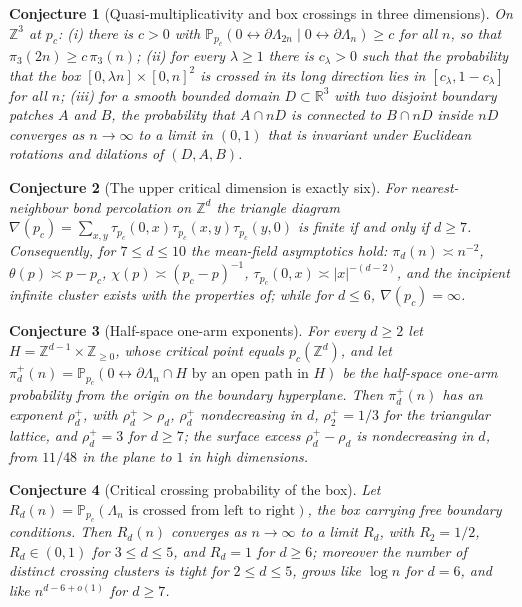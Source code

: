 \documentclass[11pt]{article}
\newtheorem{conjecture}{Conjecture}
\theoremstyle{definition}
\newcommand{\Pp}{\mathbb P}
\newcommand{\Z}{\mathbb Z}
\newcommand{\R}{\mathbb R}
\providecommand{\Z}{\mathbb Z}
\providecommand{\R}{\mathbb R}
\providecommand{\Pp}{\mathbb P}
\begin{document}
\begin{conjecture}[Quasi-multiplicativity and box crossings in three dimensions]\label{av17}
On $\Z^3$ at $p_c$: {\rm(i)} there is $c>0$ with
$\Pp_{p_c}(0\leftrightarrow\partial\Lambda_{2n}\mid0\leftrightarrow\partial\Lambda_n)\ge c$
for all $n$, so that $\pi_3(2n)\ge c\,\pi_3(n)$; {\rm(ii)} for every
$\lambda\ge1$ there is $c_\lambda>0$ such that the probability that the box
$[0,\lambda n]\times[0,n]^2$ is crossed in its long direction lies in
$[c_\lambda,1-c_\lambda]$ for all $n$; {\rm(iii)} for a smooth bounded
domain $D\subset\R^3$ with two disjoint boundary patches $A$ and $B$, the
probability that $A\cap nD$ is connected to $B\cap nD$ inside $nD$
converges as $n\to\infty$ to a limit in $(0,1)$ that is invariant under
Euclidean rotations and dilations of $(D,A,B)$.
\end{conjecture}


\begin{conjecture}[The upper critical dimension is exactly six]\label{av18}
For nearest-neighbour bond percolation on $\Z^d$ the triangle diagram
$\nabla(p_c)=\sum_{x,y}\tau_{p_c}(0,x)\tau_{p_c}(x,y)\tau_{p_c}(y,0)$ is
finite if and only if $d\ge7$.  Consequently, for $7\le d\le10$ the
mean-field asymptotics hold: $\pi_d(n)\asymp n^{-2}$,
$\theta(p)\asymp p-p_c$, $\chi(p)\asymp(p_c-p)^{-1}$,
$\tau_{p_c}(0,x)\asymp|x|^{-(d-2)}$, and the incipient infinite cluster
exists with the properties of; while for
$d\le6$, $\nabla(p_c)=\infty$.
\end{conjecture}


\begin{conjecture}[Half-space one-arm exponents]\label{av19}
For every $d\ge2$ let $H=\Z^{d-1}\times\Z_{\ge0}$, whose critical point
equals $p_c(\Z^d)$, and let
$\pi_d^+(n)=\Pp_{p_c}(0\leftrightarrow\partial\Lambda_n\cap H\text{ by an open path in }H)$
be the half-space one-arm probability from the origin on the boundary
hyperplane.  Then $\pi_d^+(n)$ has an exponent $\rho_d^+$, with $\rho_d^+>\rho_d$, $\rho_d^+$
nondecreasing in $d$, $\rho_2^+=1/3$ for the triangular lattice, and
$\rho_d^+=3$ for $d\ge7$; the surface excess $\rho_d^+-\rho_d$ is
nondecreasing in $d$, from $11/48$ in the plane to $1$ in high
dimensions.
\end{conjecture}


\begin{conjecture}[Critical crossing probability of the box]\label{av20}
Let $R_d(n)=\Pp_{p_c}(\Lambda_n\text{ is crossed from left to right})$, the
box carrying free boundary conditions.
Then $R_d(n)$ converges as $n\to\infty$ to a limit $R_d$, with
$R_2=1/2$, $R_d\in(0,1)$ for $3\le d\le5$, and $R_d=1$ for $d\ge6$;
moreover the number of distinct crossing clusters is tight for
$2\le d\le5$, grows like $\log n$ for $d=6$, and like $n^{d-6+o(1)}$ for
$d\ge7$.
\end{conjecture}
\end{document}
